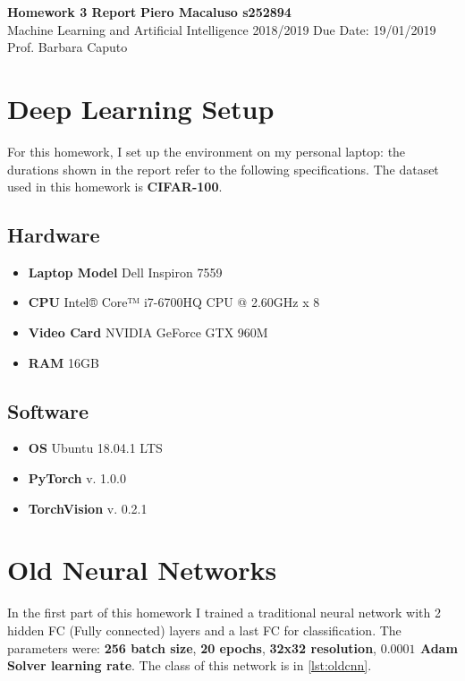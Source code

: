 \documentclass[a4paper, 11pt]{article}
\begin{document}
	\noindent
	\large\textbf{Homework 3 Report} \hfill \textbf{Piero Macaluso s252894} \\
	\normalsize Machine Learning and Artificial Intelligence 2018/2019 \hfill Due Date: 19/01/2019 \\
	Prof. Barbara Caputo  
	
	
	\section*{Deep Learning Setup}
	For this homework, I set up the environment on my personal laptop: the durations shown in the report refer to the following specifications. The dataset used in this homework is \textbf{CIFAR-100}.
	\subsection*{Hardware}
	\begin{itemize}
		\item \textbf{Laptop Model} Dell Inspiron 7559
		\item \textbf{CPU} Intel® Core™ i7-6700HQ CPU @ 2.60GHz x 8 
		\item \textbf{Video Card} NVIDIA GeForce GTX 960M
		\item \textbf{RAM} 16GB
	\end{itemize}
	
	\subsection*{Software}
	\begin{itemize}
		\item \textbf{OS} Ubuntu 18.04.1 LTS
		\item \textbf{PyTorch} v. 1.0.0
		\item \textbf{TorchVision} v. 0.2.1
	\end{itemize}
	
	
	\section{Old Neural Networks} \label{oldcnn}
	
	
	
	In the first part of this homework I trained a traditional neural network with 2 hidden FC (Fully connected) layers and a last FC for classification. The parameters were: \textbf{256 batch size}, \textbf{20 epochs}, \textbf{32x32 resolution}, \textbf{$\boldsymbol{0.0001}$ Adam Solver learning rate}. The class of this network is in \vref{lst:oldcnn}.
	
\end{document}

